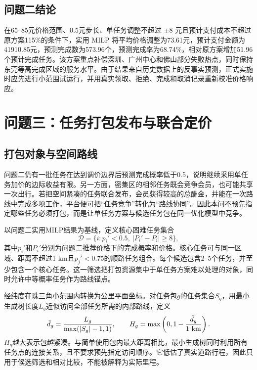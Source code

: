 ﻿\documentclass[UTF8,zihao=-4,a4paper,fontset=fandol]{ctexart}
\begin{document}
\subsection{问题二结论}

在65--85元价格范围、0.5元步长、单任务调整不超过 $\pm8$ 元且预计支付成本不超过原方案115\%的条件下，实用 MILP 将平均价格调整为73.61元，预计支付金额为41910.85元，预测完成数为573.96个，预测完成率为68.74\%，相对原方案增加51.96个预计完成任务。该方案重点补偿深圳、广州中心和佛山部分失败热点，同时保持东莞等高完成区域的服务水平。由于结果来自历史数据上的反事实预测，正式实施时应先进行小范围试运行，并用真实领取、拒绝、完成和取消记录重新校准价格响应。

\section{问题三：任务打包发布与联合定价}

\subsection{打包对象与空间路线}

问题二仍有一批任务在达到调价边界后预测完成概率低于0.5，说明继续采用单任务加价的边际收益有限。另一方面，密集区的相邻任务既会竞争会员，也可能共享一次出行。若把空间紧凑的任务联合发布，会员获得较高的总酬金，并能在一次路线中完成多项工作，平台便可把“任务竞争”转化为“路线协同”。因此本问不预先指定哪些任务必须打包，而是让单任务方案与候选任务包在同一优化模型中竞争。

以问题二实用MILP结果为基线，定义核心困难任务集合
\begin{equation}
 \mathcal D=\{i:p_i'<0.5,\ |P_i'-P_i|\geq 8\},
 \label{eq:core}
\end{equation}
其中$p_i'$和$P_i'$分别为问题二推荐价格下的完成概率和价格。核心任务可与同一区域、距离不超过1 km且$p_j'<0.75$的顺路任务组合。每个候选包含2--5个任务，并至少包含一个核心任务。这一筛选把打包资源集中于单任务方案难以处理的对象，同时允许中等概率任务作为路线锚点。

经纬度在珠三角小范围内转换为公里平面坐标。对任务包$g$的任务集合$S_g$，用最小生成树长度$L_g$近似访问全部任务所需的内部路线，定义
\begin{equation}
 \bar d_g=\frac{L_g}{\max(|S_g|-1,1)},\qquad
 H_g=\max\left(0,1-\frac{\bar d_g}{1\ {\rm km}}\right).
 \label{eq:compact}
\end{equation}
$H_g$越大表示包越紧凑。与简单使用包内最大距离相比，最小生成树同时利用所有任务点的连接关系，且不要求预先指定访问顺序。它低估了真实道路行程，因此只用于候选筛选和相对比较，不能被解释为实际里程。
\end{document}
